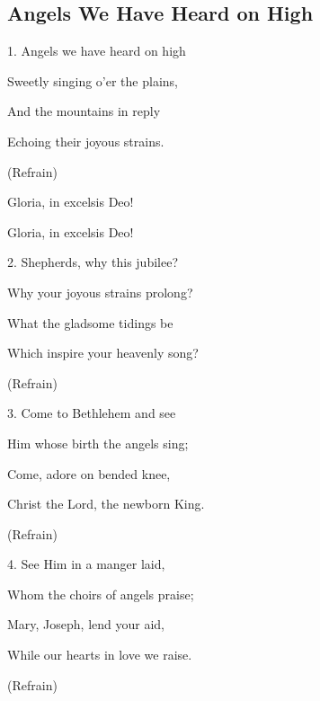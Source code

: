 \subsection{Angels We Have Heard on High}\label{angels_we_have_heard_on_high}
\begin{description}[nosep,leftmargin=\parindent,labelsep=0pt]
\item 1. Angels we have heard on high 
\item Sweetly singing o'er the plains, 
\item And the mountains in reply 
\item Echoing their joyous strains. 
\vspace{1.5ex}
\item (Refrain) 
\item Gloria, in excelsis Deo! 
\item Gloria, in excelsis Deo! 
\vspace{1.5ex}
\item 2. Shepherds, why this jubilee? 
\item Why your joyous strains prolong? 
\item What the gladsome tidings be 
\item Which inspire your heavenly song? 
\item (Refrain) 
\vspace{1.5ex}
\item 3. Come to Bethlehem and see 
\item Him whose birth the angels sing; 
\item Come, adore on bended knee, 
\item Christ the Lord, the newborn King. 
\item (Refrain) 
\vspace{1.5ex}
\item 4. See Him in a manger laid, 
\item Whom the choirs of angels praise; 
\item Mary, Joseph, lend your aid, 
\item While our hearts in love we raise. 
\item (Refrain) 
\end{description}
